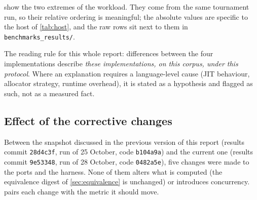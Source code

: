  show the two extremes of the workload.
They come from the same tournament run, so their relative ordering is
meaningful; the absolute values are specific to the host of
\cref{tab:host}, and the raw rows sit next to them in
\texttt{benchmarks\_\allowbreak results/}.

The reading rule for this whole report: differences between the four
implementations describe \emph{these implementations, on this corpus, under
this protocol}. Where an explanation requires a language-level cause (JIT
behaviour, allocator strategy, runtime overhead), it is stated as a
hypothesis and flagged as such, not as a measured fact.

\subsection{Effect of the corrective changes}
\label{sec:refactor-effect}

Between the snapshot discussed in the previous version of this report
(results commit \texttt{28d4c3f}, run of 25 October, code \texttt{b104a9a})
and the current one (results commit \texttt{9e53348}, run of 28 October,
code \texttt{0482a5e}), five changes were made to the ports and the harness.
None of them alters what is computed (the equivalence digest of
\cref{sec:equivalence} is unchanged) or introduces concurrency.
 pairs each change with the metric it should
move.

